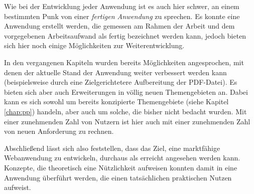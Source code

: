Wie bei der Entwicklung jeder Anwendung ist es auch hier schwer, an einem bestimmten Punk von einer \textit{fertigen Anwendung} zu sprechen. Es konnte eine Anwendung erstellt werden, die gemessen am Rahmen der Arbeit und dem vorgegebenen Arbeitsaufwand als fertig bezeichnet werden kann, jedoch bieten sich hier noch einige Möglichkeiten zur Weiterentwicklung.

In den vergangenen Kapiteln wurden bereits Möglichkeiten angesprochen, mit denen der aktuelle Stand der Anwendung weiter verbessert werden kann (beispielsweise durch eine Zielgerichtetere Aufbereitung der PDF-Datei).
Es bieten sich aber auch Erweiterungen in völlig neuen Themengebieten an. Dabei kann es sich sowohl um bereits konzipierte Themengebiete (siehe Kapitel \ref{chap:pp}) handeln, aber auch um solche, die bisher nicht bedacht wurden. Mit einer zunehmenden Zahl von Nutzern ist hier auch mit einer zunehmenden Zahl von neuen Anforderung zu rechnen.

Abschließend lässt sich also feststellen, dass das Ziel, eine marktfähige Webanwendung zu entwickeln, durchaus als erreicht angesehen werden kann. Konzepte, die theoretisch eine Nützlichkeit aufweisen konnten damit in eine Anwendung überführt werden, die einen tatsächlichen praktischen Nutzen aufweist.
